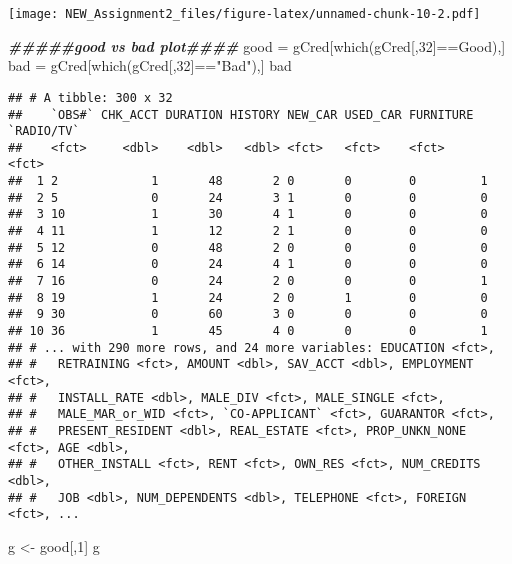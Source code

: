 \documentclass[
]{article}
\newenvironment{Shaded}{\begin{snugshade}}{\end{snugshade}}
\newcommand{\DecValTok}[1]{\textcolor[rgb]{0.00,0.00,0.81}{#1}}
\newcommand{\DocumentationTok}[1]{\textcolor[rgb]{0.56,0.35,0.01}{\textbf{\textit{#1}}}}
\newcommand{\FunctionTok}[1]{\textcolor[rgb]{0.00,0.00,0.00}{#1}}
\newcommand{\NormalTok}[1]{#1}
\newcommand{\OtherTok}[1]{\textcolor[rgb]{0.56,0.35,0.01}{#1}}
\newcommand{\SpecialCharTok}[1]{\textcolor[rgb]{0.00,0.00,0.00}{#1}}
\newcommand{\StringTok}[1]{\textcolor[rgb]{0.31,0.60,0.02}{#1}}
\begin{document}
\texttt{[image: NEW\_Assignment2\_files/figure-latex/unnamed-chunk-10-2.pdf]}

\begin{Shaded}
\begin{Highlighting}[]
\DocumentationTok{\#\#\#\#\#good vs bad plot\#\#\#\#}
\NormalTok{good }\OtherTok{=}\NormalTok{ gCred[}\FunctionTok{which}\NormalTok{(gCred[,}\DecValTok{32}\NormalTok{]}\SpecialCharTok{==}\StringTok{\textquotesingle{}Good\textquotesingle{}}\NormalTok{),]}
\NormalTok{bad }\OtherTok{=}\NormalTok{ gCred[}\FunctionTok{which}\NormalTok{(gCred[,}\DecValTok{32}\NormalTok{]}\SpecialCharTok{==}\StringTok{"Bad"}\NormalTok{),]}
\NormalTok{bad}
\end{Highlighting}
\end{Shaded}

\begin{verbatim}
## # A tibble: 300 x 32
##    `OBS#` CHK_ACCT DURATION HISTORY NEW_CAR USED_CAR FURNITURE `RADIO/TV`
##    <fct>     <dbl>    <dbl>   <dbl> <fct>   <fct>    <fct>     <fct>     
##  1 2             1       48       2 0       0        0         1         
##  2 5             0       24       3 1       0        0         0         
##  3 10            1       30       4 1       0        0         0         
##  4 11            1       12       2 1       0        0         0         
##  5 12            0       48       2 0       0        0         0         
##  6 14            0       24       4 1       0        0         0         
##  7 16            0       24       2 0       0        0         1         
##  8 19            1       24       2 0       1        0         0         
##  9 30            0       60       3 0       0        0         0         
## 10 36            1       45       4 0       0        0         1         
## # ... with 290 more rows, and 24 more variables: EDUCATION <fct>,
## #   RETRAINING <fct>, AMOUNT <dbl>, SAV_ACCT <dbl>, EMPLOYMENT <fct>,
## #   INSTALL_RATE <dbl>, MALE_DIV <fct>, MALE_SINGLE <fct>,
## #   MALE_MAR_or_WID <fct>, `CO-APPLICANT` <fct>, GUARANTOR <fct>,
## #   PRESENT_RESIDENT <dbl>, REAL_ESTATE <fct>, PROP_UNKN_NONE <fct>, AGE <dbl>,
## #   OTHER_INSTALL <fct>, RENT <fct>, OWN_RES <fct>, NUM_CREDITS <dbl>,
## #   JOB <dbl>, NUM_DEPENDENTS <dbl>, TELEPHONE <fct>, FOREIGN <fct>, ...
\end{verbatim}

\begin{Shaded}
\begin{Highlighting}[]
\NormalTok{g }\OtherTok{\textless{}{-}}\NormalTok{ good[,}\DecValTok{1}\NormalTok{]}
\NormalTok{g}
\end{Highlighting}
\end{Shaded}
\end{document}
